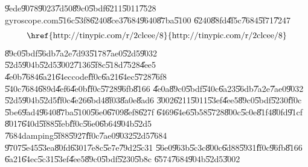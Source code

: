 \U{9ede}\U{9078}\U{9023}\U{7d50}\U{89c0}\U{5bdf}\U{6211}\U{5011}\U{7528}%
gyroscope.com\U{516c}\U{53f8}\U{6240}\U{8ce3}\U{7684}\U{9640}\U{87ba}\U{5100}%
\U{6240}\U{88fd}\U{4f5c}\U{7684}\U{5f71}\U{7247}%
\begin{equation*}
\text{\href{http://tinypic.com/r/2clcee/8}{http://tinypic.com/r/2clcee/8}}
\end{equation*}%
\U{89c0}\U{5bdf}\U{56db}\U{7a2e}\U{7d93}\U{5178}\U{7ae0}\U{52d5}\U{9032}%
\U{52d5}\U{904b}\U{52d5}\U{3002}\U{7136}\U{5f8c}\U{518d}\U{7528}\U{4ee5}%
\U{4e0b}\U{7684}\U{6a21}\U{64ec}code\U{ff0c}\U{6a21}\U{64ec}\U{5728}\U{76f8}%
\U{540c}\U{7684}\U{689d}\U{4ef6}\U{4e0b}\U{ff0c}\U{5728}\U{96fb}\U{8166}%
\U{4e0a}\U{89c0}\U{5bdf}\U{540c}\U{6a23}\U{56db}\U{7a2e}\U{7ae0}\U{9032}%
\U{52d5}\U{904b}\U{52d5}\U{ff0c}\U{4e26}\U{6bd4}\U{8f03}\U{8a0e}\U{8ad6}%
\U{3002}\U{6211}\U{5011}\U{53ef}\U{4ee5}\U{89c0}\U{5bdf}\U{5230}\U{ff0c}%
\U{5be6}\U{9ad4}\U{9640}\U{87ba}\U{5100}\U{56e0}\U{6709}\U{8ef8}\U{627f}%
\U{6469}\U{64e6}\U{5b58}\U{5728}\U{800c}\U{5c0e}\U{81f4}\U{80fd}\U{91cf}%
\U{8017}\U{640d}\U{5f88}\U{5feb}\U{ff0c}\U{56e0}\U{6b64}\U{904b}\U{52d5}%
\U{7684}damping\U{5f88}\U{5927}\U{ff0c}\U{7ae0}\U{9032}\U{52d5}\U{7684}%
\U{9707}\U{5e45}\U{53ea}\U{80fd}\U{6301}\U{7e8c}\U{5e7e}\U{79d2}\U{5c31}%
\U{56e0}\U{963b}\U{5c3c}\U{800c}\U{6d88}\U{5931}\U{ff0c}\U{96fb}\U{8166}%
\U{6a21}\U{64ec}\U{5c31}\U{53ef}\U{4ee5}\U{89c0}\U{5bdf}\U{5230}\U{5b8c}%
\U{6574}\U{7684}\U{904b}\U{52d5}\U{3002}

%

